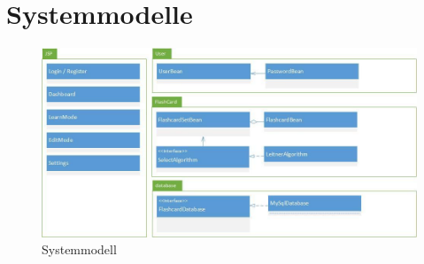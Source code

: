 \section{Systemmodelle}
\begin{figure}[h!]
    \centering
    \includegraphics[width=\textwidth]{images/Systemmodell-Visio.jpg}
    \caption{Systemmodell}
    \label{fig:systemmodell}
\end{figure}


